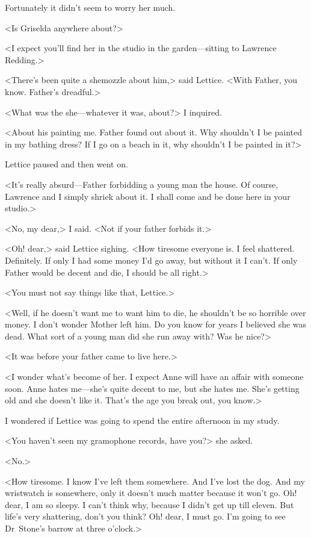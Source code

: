 Fortunately it didn't seem to worry her much.

<Is Griselda anywhere about?>

<I expect you'll find her in the studio in the garden—sitting to Lawrence Redding.>

<There's been quite a shemozzle about him,> said Lettice. <With Father, you know. Father's dreadful.>

<What was the she—whatever it was, about?> I inquired.

<About his painting me. Father found out about it. Why shouldn't I be painted in my bathing dress? If I go on a beach in it, why shouldn't I be painted in it?>

Lettice paused and then went on.

<It's really absurd—Father forbidding a young man the house. Of course, Lawrence and I simply shriek about it. I shall come and be done here in your studio.>

<No, my dear,> I said. <Not if your father forbids it.>

<Oh! dear,> said Lettice sighing. <How tiresome everyone is. I feel shattered. Definitely. If only I had some money I'd go away, but without it I can't. If only Father would be decent and die, I should be all right.>

<You must not say things like that, Lettice.>

<Well, if he doesn't want me to want him to die, he shouldn't be so horrible over money. I don't wonder Mother left him. Do you know for years I believed she was dead. What sort of a young man did she run away with? Was he nice?>

<It was before your father came to live here.>

<I wonder what's become of her. I expect Anne will have an affair with someone soon. Anne hates me—she's quite decent to me, but she hates me. She's getting old and she doesn't like it. That's the age you break out, you know.>

I wondered if Lettice was going to spend the entire afternoon in my study.

<You haven't seen my gramophone records, have you?> she asked.

<No.>

<How tiresome. I know I've left them somewhere. And I've lost the dog. And my wristwatch is somewhere, only it doesn't much matter because it won't go. Oh! dear, I am so sleepy. I can't think why, because I didn't get up till eleven. But life's very shattering, don't you think? Oh! dear, I must go. I'm going to see Dr~Stone's barrow at three o'clock.>

